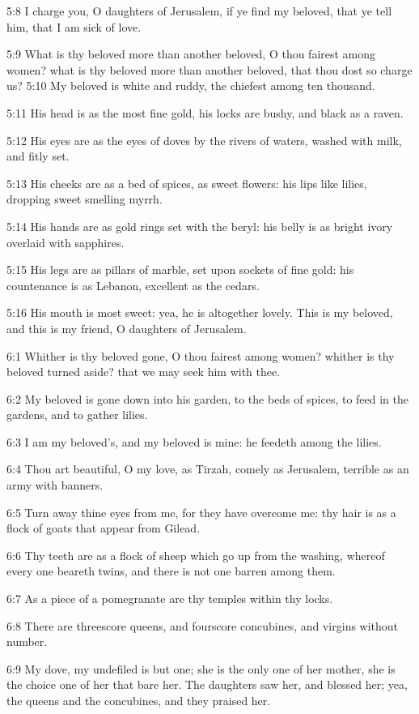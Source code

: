 5:8 I charge you, O daughters of Jerusalem, if ye find my beloved,
that ye tell him, that I am sick of love.

5:9 What is thy beloved more than another beloved, O thou fairest
among women? what is thy beloved more than another beloved, that thou
dost so charge us?  5:10 My beloved is white and ruddy, the chiefest
among ten thousand.

5:11 His head is as the most fine gold, his locks are bushy, and black
as a raven.

5:12 His eyes are as the eyes of doves by the rivers of waters, washed
with milk, and fitly set.

5:13 His cheeks are as a bed of spices, as sweet flowers: his lips
like lilies, dropping sweet smelling myrrh.

5:14 His hands are as gold rings set with the beryl: his belly is as
bright ivory overlaid with sapphires.

5:15 His legs are as pillars of marble, set upon sockets of fine gold:
his countenance is as Lebanon, excellent as the cedars.

5:16 His mouth is most sweet: yea, he is altogether lovely. This is my
beloved, and this is my friend, O daughters of Jerusalem.

6:1 Whither is thy beloved gone, O thou fairest among women? whither
is thy beloved turned aside? that we may seek him with thee.

6:2 My beloved is gone down into his garden, to the beds of spices, to
feed in the gardens, and to gather lilies.

6:3 I am my beloved's, and my beloved is mine: he feedeth among the
lilies.

6:4 Thou art beautiful, O my love, as Tirzah, comely as Jerusalem,
terrible as an army with banners.

6:5 Turn away thine eyes from me, for they have overcome me: thy hair
is as a flock of goats that appear from Gilead.

6:6 Thy teeth are as a flock of sheep which go up from the washing,
whereof every one beareth twins, and there is not one barren among
them.

6:7 As a piece of a pomegranate are thy temples within thy locks.

6:8 There are threescore queens, and fourscore concubines, and virgins
without number.

6:9 My dove, my undefiled is but one; she is the only one of her
mother, she is the choice one of her that bare her. The daughters saw
her, and blessed her; yea, the queens and the concubines, and they
praised her.

